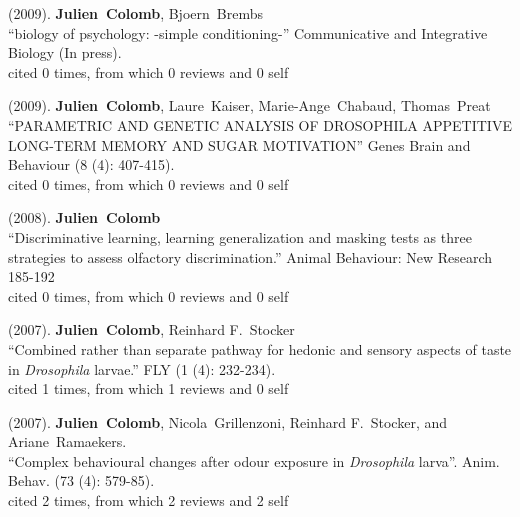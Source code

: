 \begin{itemize}
\begin{sloppypar}
\newcommand{\enquote}[1]{``#1''}
\providecommand{\bibinfo}[2]{#2}

\item   (\bibinfo{year}{2009}).  
 \bibinfo{author}{\textbf{Julien~Colomb}}, \bibinfo{author}{Bjoern~Brembs} \\
\newblock \enquote{\bibinfo{title}{biology of psychology: -simple conditioning-}}
\newblock \bibinfo{journal}{Communicative and Integrative Biology}
  (\bibinfo{pages}{In press}).
   \\cited 0 times, from which 0 reviews and 0 self


\item   (\bibinfo{year}{2009}).  
 \bibinfo{author}{\textbf{Julien~Colomb}}, \bibinfo{author}{Laure~Kaiser}, \bibinfo{author}{Marie-Ange~Chabaud}, \bibinfo{author}{Thomas~Preat}
\\
\newblock \enquote{\bibinfo{title}{PARAMETRIC AND GENETIC ANALYSIS OF DROSOPHILA APPETITIVE LONG-TERM MEMORY AND SUGAR MOTIVATION}}
\newblock \bibinfo{journal}{Genes Brain and Behaviour}
  (\bibinfo{pages}{8 (4): 407-415}).
   \\cited 0 times, from which 0 reviews and 0 self
   

   

 \item   (\bibinfo{year}{2008}).  
 \bibinfo{author}{\textbf{Julien~Colomb}}\\
\newblock \enquote{\bibinfo{title}{Discriminative learning, learning generalization and masking tests as three strategies to assess olfactory discrimination.}}
\newblock \bibinfo{book}{Animal Behaviour: New Research}
\bibinfo{pages}{185-192}
\\ cited 0 times, from which 0 reviews and 0 self

 \item   (\bibinfo{year}{2007}).  
 \bibinfo{author}{\textbf{Julien~Colomb}}, \bibinfo{author}{Reinhard F.~Stocker}\\
\newblock \enquote{\bibinfo{title}{Combined rather than separate pathway for hedonic and sensory aspects of taste in  \textit{Drosophila} larvae.}}
\newblock \bibinfo{journal}{FLY}
  (\bibinfo{pages}{1 (4): 232-234}).
 \\
 cited 1 times, from which 1 reviews and 0 self
 
\item  (\bibinfo{year}{2007}).
  \bibinfo{author}{\textbf{Julien~Colomb}}, \bibinfo{author}{Nicola~Grillenzoni},
  \bibinfo{author}{Reinhard F.~Stocker}, and \bibinfo{author}{Ariane~Ramaekers}. \\
\newblock \enquote{\bibinfo{title}{Complex behavioural changes after odour exposure in \textit{Drosophila} larva}}.
\newblock \bibinfo{journal}{Anim. Behav.}
  (\bibinfo{pages}{73 (4): 579-85}).
   \\ cited 2 times, from which 2 reviews and 2 self
 

\end{sloppypar}
\end{itemize}
